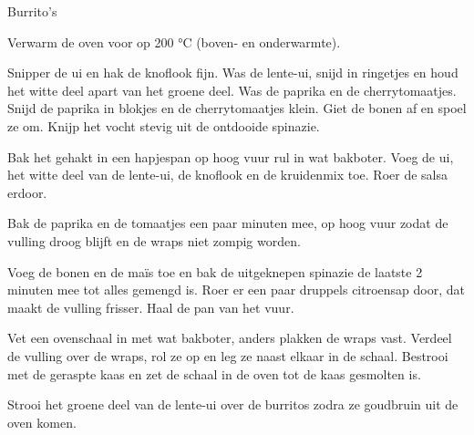 \begin{recipe}{Burrito's}
\begin{steps}
  \item Verwarm de oven voor op 200 °C (boven- en onderwarmte).
  \item Snipper de ui en hak de knoflook fijn. Was de lente-ui, snijd in ringetjes
        en houd het witte deel apart van het groene deel. Was de paprika en de
        cherrytomaatjes. Snijd de paprika in blokjes en de cherrytomaatjes klein.
        Giet de bonen af en spoel ze om. Knijp het vocht stevig uit de ontdooide
        spinazie.
  \item Bak het gehakt in een hapjespan op hoog vuur rul in wat bakboter. Voeg de
        ui, het witte deel van de lente-ui, de knoflook en de kruidenmix toe.
        Roer de salsa erdoor.
  \item Bak de paprika en de tomaatjes een paar minuten mee, op hoog vuur zodat
        de vulling droog blijft en de wraps niet zompig worden.
  \item Voeg de bonen en de maïs toe en bak de uitgeknepen spinazie de laatste
        2 minuten mee tot alles gemengd is. Roer er een paar druppels citroensap
        door, dat maakt de vulling frisser. Haal de pan van het vuur.
  \item Vet een ovenschaal in met wat bakboter, anders plakken de wraps vast. Verdeel de vulling
        over de wraps, rol ze op en leg ze naast elkaar in de schaal. Bestrooi
        met de geraspte kaas en zet de schaal in de oven tot de kaas gesmolten
        is.
  \item Strooi het groene deel van de lente-ui over de burritos zodra ze goudbruin
        uit de oven komen.
\end{steps}
\end{recipe}

